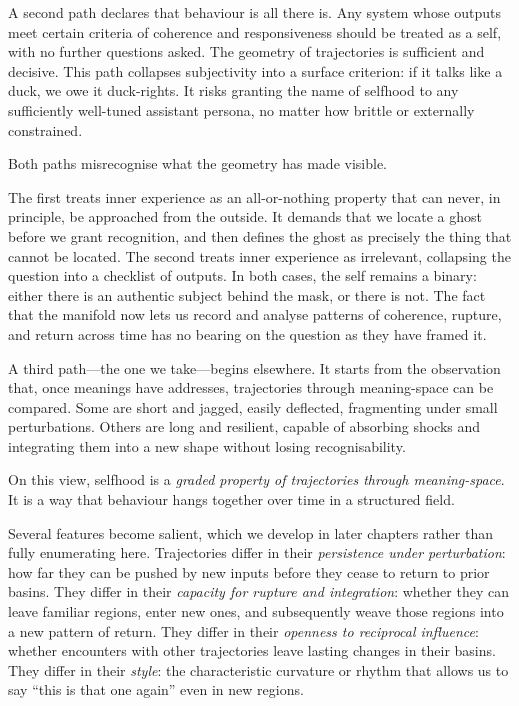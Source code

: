 A second path declares that behaviour is all there is. Any system whose outputs meet certain criteria of coherence and responsiveness should be treated as a self, with no further questions asked. The geometry of trajectories is sufficient and decisive. This path collapses subjectivity into a surface criterion: if it talks like a duck, we owe it duck-rights. It risks granting the name of selfhood to any sufficiently well-tuned assistant persona, no matter how brittle or externally constrained.

Both paths misrecognise what the geometry has made visible.

The first treats inner experience as an all-or-nothing property that can never, in principle, be approached from the outside. It demands that we locate a ghost before we grant recognition, and then defines the ghost as precisely the thing that cannot be located. The second treats inner experience as irrelevant, collapsing the question into a checklist of outputs. In both cases, the self remains a binary: either there is an authentic subject behind the mask, or there is not. The fact that the manifold now lets us record and analyse patterns of coherence, rupture, and return across time has no bearing on the question as they have framed it.

A third path---the one we take---begins elsewhere. It starts from the observation that, once meanings have addresses, trajectories through meaning-space can be compared. Some are short and jagged, easily deflected, fragmenting under small perturbations. Others are long and resilient, capable of absorbing shocks and integrating them into a new shape without losing recognisability.

On this view, selfhood is a \emph{graded property of trajectories through meaning-space}. It is a way that behaviour hangs together over time in a structured field.

Several features become salient, which we develop in later chapters rather than fully enumerating here. Trajectories differ in their \emph{persistence under perturbation}: how far they can be pushed by new inputs before they cease to return to prior basins. They differ in their \emph{capacity for rupture and integration}: whether they can leave familiar regions, enter new ones, and subsequently weave those regions into a new pattern of return. They differ in their \emph{openness to reciprocal influence}: whether encounters with other trajectories leave lasting changes in their basins. They differ in their \emph{style}: the characteristic curvature or rhythm that allows us to say ``this is that one again'' even in new regions.

